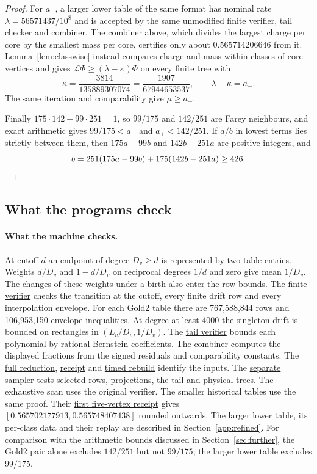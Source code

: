 \documentclass[11pt]{article}
\newcommand{\proofsrc}[2]{\href{https://github.com/uzay-eth/friend-tree-exponent/blob/a0972085ad72ad5685ae7b424988648d1965e73c/#1}{#2}}
\theoremstyle{remark}
\numberwithin{equation}{section}
\begin{document}
\begin{proof}
For $a_-$, a larger lower table of the same format has nominal rate $\lambda=56571437/10^8$ and is accepted by the same unmodified finite verifier, tail checker and combiner. The combiner above, which divides the largest charge per core by the smallest mass per core, certifies only about $0.565714206646$ from it. Lemma~\ref{lem:classwise} instead compares charge and mass within classes of core vertices and gives $\mathcal L\Phi\ge(\lambda-\kappa)\Phi$ on every finite tree with
\[
 \kappa=\frac{3814}{135889307074}=\frac{1907}{67944653537},\qquad
 \lambda-\kappa=a_- .
\]
The same iteration and comparability give $\mu\ge a_-$.

Finally $175\cdot142-99\cdot251=1$, so $99/175$ and $142/251$ are Farey neighbours, and exact arithmetic gives $99/175<a_-$ and $a_+<142/251$. If $a/b$ in lowest terms lies strictly between them, then $175a-99b$ and $142b-251a$ are positive integers, and
\[
 b=251(175a-99b)+175(142b-251a)\ge 426 .\qedhere
\]
\end{proof}

\subsection{What the programs check}\label{sec:enc-check}
\paragraph{What the machine checks.}
At cutoff $d$ an endpoint of degree $D_v\ge d$ is represented by two table entries. Weights $d/D_v$ and $1-d/D_v$ on reciprocal degrees $1/d$ and zero give mean $1/D_v$. The changes of these weights under a birth also enter the row bounds. The \proofsrc{round2/proofs/neon2/quintet-cert/verify_quintet.cpp}{finite verifier} checks the transition at the cutoff, every finite drift row and every interpolation envelope. For each Gold2 table there are 767,588,844 rows and 106,953,150 envelope inequalities. At degree at least 4000 the singleton drift is bounded on rectangles in $(L_v/D_v,1/D_v)$. The \proofsrc{round2/proofs/neon2/quintet-cert/verify_tail_bernstein.py}{tail verifier} bounds each polynomial by rational Bernstein coefficients. The \proofsrc{round2/proofs/neon2/quintet-cert/cert_check.py}{combiner} computes the displayed fractions from the signed residuals and comparability constants. The \proofsrc{round2/proofs/neon2/quintet-cert/PROOF.md}{full reduction}, \proofsrc{round2/proofs/neon2/quintet-cert/certificate_gold2.json}{receipt} and \proofsrc{round2/verify/gold/RESULTS.md}{timed rebuild} identify the inputs. The \proofsrc{round2/proofs/neon2/quintet-cert/audit_independent.py}{separate sampler} tests selected rows, projections, the tail and physical trees. The exhaustive scan uses the original verifier. The smaller historical tables use the same proof. Their \proofsrc{round2/proofs/neon2/quintet-cert/certificate_gold1.json}{first five-vertex receipt} gives $[0.565702177913,0.565748407438]$ rounded outwards. The larger lower table, its per-class data and their replay are described in Section~\ref{app:refined}. For comparison with the arithmetic bounds discussed in Section~\ref{sec:further}, the Gold2 pair alone excludes $142/251$ but not $99/175$; the larger lower table excludes $99/175$.
\end{document}
